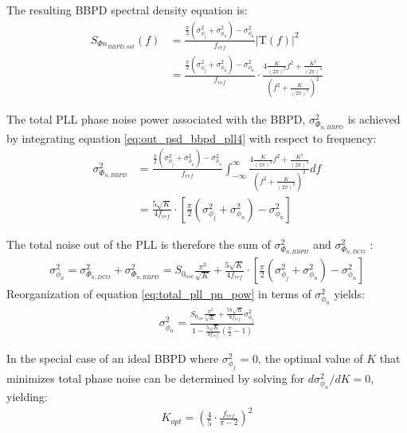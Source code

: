 			The resulting BBPD spectral density equation is:
			\begin{align}\label{eq:out_psd_bbpd_pll4} 
				S_{\Phi n_{BBPD,out}}(f) & =
				\frac{\frac{\pi}{2}(\sigma^2_{\phi_j} +
				\sigma^2_{\phi_n})-\sigma^2_{\phi_n}}{f_{ref}}\left|\mathrm{T}(f)\right|^2
				\\&= \frac{\frac{\pi}{2}(\sigma^2_{\phi_j} +
				\sigma^2_{\phi_n})-\sigma^2_{\phi_n}}{f_{ref}}\cdot\frac{4\frac{K}{(2\pi)^2}f^2
				+ \frac{K^2}{(2\pi)^4}}{\left(f^2+\frac{K}{(2\pi)^2}\right)^2} 
			\end{align} 

			The total PLL phase noise power associated with the BBPD, $\sigma_{\Phi_{n,BBPD}}^2$ is achieved by integrating equation \ref{eq:out_psd_bbpd_pll4} with respect to frequency:
			\begin{align}\label{eq:out_psd_bbpd_pll4} 
				\sigma_{\Phi_{n,BBPD}}^2 & =
				\frac{\frac{\pi}{2}(\sigma^2_{\phi_j} +
				\sigma^2_{\phi_n})-\sigma^2_{\phi_n}}{f_{ref}}\int_{-\infty}^{\infty}\frac{4\frac{K}{(2\pi)^2}f^2
				+ \frac{K^2}{(2\pi)^4}}{\left(f^2+\frac{K}{(2\pi)^2}\right)^2}df\\ &= 
				\frac{5\sqrt{K}}{4f_{ref}}\cdot\left[\frac{\pi}{2}(\sigma^2_{\phi_j} +
			\sigma^2_{\phi_n})-\sigma^2_{\phi_n}\right] \end{align} 

			The total noise out of the PLL is therefore the sum of $\sigma_{\Phi_{n,BBPD}}^2$ and $\sigma_{\Phi_{n,DCO}}^2$ : 
			\begin{align} \label{eq:total_pll_pn_pow}
				\sigma^2_{\phi_n}  = \sigma_{\Phi_{n,DCO}}^2 + \sigma_{\Phi_{n,BBPD}}^2 =
				S_{0_{osc}}\frac{\pi^2}{\sqrt{K}} +
				\frac{5\sqrt{K}}{4f_{ref}}\cdot\left[\frac{\pi}{2}(\sigma^2_{\phi_j} +
				\sigma^2_{\phi_n})-\sigma^2_{\phi_n}\right] 
			\end{align} 
			Reorganization of equation \ref{eq:total_pll_pn_pow} in terms of $\sigma^2_{\phi_n}$ yields:
			\begin{align} \label{eq:total_pll_pn_pow2} \sigma^2_{\phi_n}  =
				\frac{S_{0_{osc}}\frac{\pi^2}{\sqrt{K}} +
				\frac{5\pi\sqrt{K}}{8f_{ref}}\sigma^2_{\phi_j}}{1-\frac{5\sqrt{K}}{4f_{ref}}(\frac{\pi}{2}-1)}
			\end{align}			 

			In the special case of an ideal BBPD where $\sigma^2_{\phi_j}$ = 0, the optimal value of $K$ that minimizes total phase noise can be determined by solving for $d\sigma^2_{\phi_n}/dK = 0$, yielding:
			\begin{align} \label{eq:k_opt} K_{opt} =
				\left(\frac{4}{5}\cdot\frac{f_{ref}}{\pi-2}\right)^2 
			\end{align}	 

